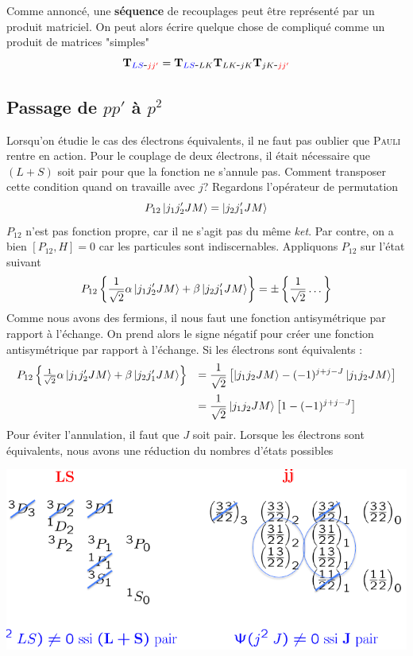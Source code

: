 Comme annoncé, une \textbf{séquence} de recouplages peut être représenté
par un produit matriciel. On peut alors écrire quelque chose de compliqué
comme un produit de matrices "simples"
\begin{equation}
{\bf T}_{ {\color{blue} LS} \mbox{-} {\color{red} jj'} } =
{\bf T}_{ {\color{blue} LS} \mbox{-}  LK }
{\bf T}_{ LK \mbox{-}  jK }
{\bf T}_{ jK \mbox {-}  {\color{red} jj'} }
\end{equation}

\subsection{Passage de $pp'$ à $p^2$}
Lorsqu'on étudie le cas des électrons équivalents, il ne faut pas oublier que
\textsc{Pauli} rentre en action. Pour le couplage de deux électrons, il était
nécessaire que $(L+S)$ soit pair pour que la fonction ne s'annule pas. Comment
transposer cette condition quand on travaille avec $j$? Regardons l'opérateur de 
permutation
\begin{equation}
P_{12}\ket{j_1j_2'JM} = \ket{j_2j_1'JM}
\end{equation}
$P_{12}$ n'est pas fonction propre, car il ne s'agit pas du même \textit{ket}. Par
contre, on a bien $[P_{12},H]=0$ car les particules sont indiscernables. Appliquons
$P_{12}$ sur l'état suivant
\begin{equation}
P_{12}\left\{\frac{1}{\sqrt{2}}\alpha\ket{j_1j_2'JM}+\beta\ket{j_2j_1'JM}\right\} =
\pm \left\{\dfrac{1}{\sqrt{2}}\dots\right\}
\end{equation}
Comme nous avons des fermions, il nous faut une fonction antisymétrique par rapport à
l'échange. On prend alors le signe négatif pour créer une fonction antisymétrique par
rapport à l'échange. Si les électrons sont équivalents :
\begin{equation}
\begin{array}{ll}
P_{12}\left\{\frac{1}{\sqrt{2}}\alpha\ket{j_1j_2'JM}+\beta\ket{j_2j_1'JM}\right\} &=\DS\frac{1}{\sqrt{2}}
\left[\ket{j_1j_2JM}-(-1)^{j+j-J}\ket{j_1j_2JM}\right]\vspace{2mm}\\
&=\DS \frac{1}{\sqrt{2}}\ket{j_1j_2JM}\left[1-(-1)^{j+j-J}\right]
\end{array}
\end{equation}
Pour éviter l'annulation, il faut que $J$ soit pair. Lorsque les électrons sont
équivalents, nous avons une réduction du nombres d'états possibles 
\begin{center}
	\includegraphics[scale=0.5]{ch1/image13}
\end{center}
